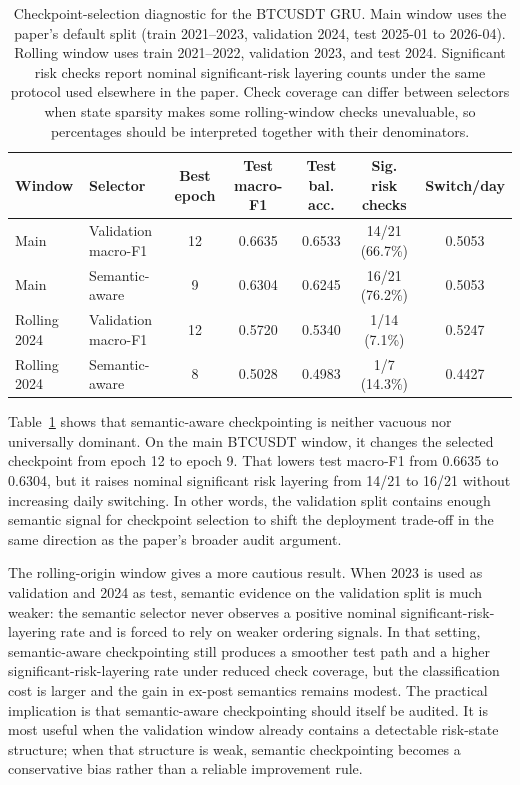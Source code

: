 \documentclass[a4paper,fleqn]{cas-dc}
\begin{document}
\begin{table}[t]
\caption{Checkpoint-selection diagnostic for the BTCUSDT GRU. Main window uses the paper's default split (train 2021--2023, validation 2024, test 2025-01 to 2026-04). Rolling window uses train 2021--2022, validation 2023, and test 2024. Significant risk checks report nominal significant-risk layering counts under the same protocol used elsewhere in the paper. Check coverage can differ between selectors when state sparsity makes some rolling-window checks unevaluable, so percentages should be interpreted together with their denominators.}
\label{tab:checkpoint-selection}
\centering
\scriptsize
\setlength{\tabcolsep}{4pt}
\begin{tabular}{llccccc}
\toprule
Window & Selector & Best epoch & Test macro-F1 & Test bal. acc. & Sig. risk checks & Switch/day \\
\midrule
Main & Validation macro-F1 & 12 & 0.6635 & 0.6533 & 14/21 (66.7\%) & 0.5053 \\
Main & Semantic-aware & 9 & 0.6304 & 0.6245 & 16/21 (76.2\%) & 0.5053 \\
\midrule
Rolling 2024 & Validation macro-F1 & 12 & 0.5720 & 0.5340 & 1/14 (7.1\%) & 0.5247 \\
Rolling 2024 & Semantic-aware & 8 & 0.5028 & 0.4983 & 1/7 (14.3\%) & 0.4427 \\
\bottomrule
\end{tabular}
\end{table}

Table~\ref{tab:checkpoint-selection} shows that semantic-aware checkpointing is neither vacuous nor universally dominant. On the main BTCUSDT window, it changes the selected checkpoint from epoch 12 to epoch 9. That lowers test macro-F1 from 0.6635 to 0.6304, but it raises nominal significant risk layering from 14/21 to 16/21 without increasing daily switching. In other words, the validation split contains enough semantic signal for checkpoint selection to shift the deployment trade-off in the same direction as the paper's broader audit argument.

The rolling-origin window gives a more cautious result. When 2023 is used as validation and 2024 as test, semantic evidence on the validation split is much weaker: the semantic selector never observes a positive nominal significant-risk-layering rate and is forced to rely on weaker ordering signals. In that setting, semantic-aware checkpointing still produces a smoother test path and a higher significant-risk-layering rate under reduced check coverage, but the classification cost is larger and the gain in ex-post semantics remains modest. The practical implication is that semantic-aware checkpointing should itself be audited. It is most useful when the validation window already contains a detectable risk-state structure; when that structure is weak, semantic checkpointing becomes a conservative bias rather than a reliable improvement rule.
\end{document}
